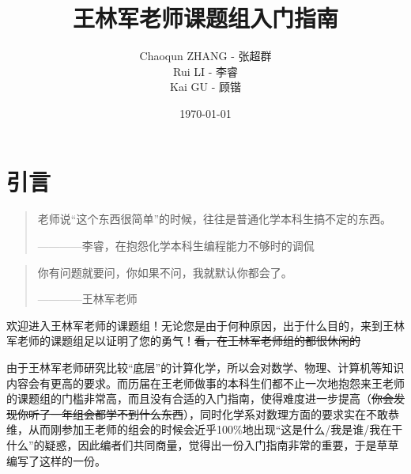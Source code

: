 \documentclass[12pt,a4paper,openany,twoside]{book}
\title{王林军老师课题组入门指南}
\author{Chaoqun ZHANG - 张超群\\Rui LI - 李睿\\Kai GU - 顾锴}
\date{\today}
\numberwithin{equation}{section}
\begin{document}
    \maketitle
    \tableofcontents
    \setcounter{page}{1}   %
    \makeatletter
    \let\ps@plain\ps@empty
    \makeatother
    \tableofcontents                                    %
    \mainmatter\medskip    %
    
    
    
    \newpage
    \chapter*{引言}
      \begin{quote}
        老师说“这个东西很简单”的时候，往往是普通化学本科生搞不定的东西。
        \begin{flushright}
          ————李睿，在抱怨化学本科生编程能力不够时的调侃
        \end{flushright}
      \end{quote}
      \begin{quote}
        你有问题就要问，你如果不问，我就默认你都会了。
        \begin{flushright}
          ————王林军老师
        \end{flushright}
      \end{quote}

      欢迎进入王林军老师的课题组！无论您是由于何种原因，出于什么目的，来到王林军老师的课题组足以证明了您的勇气！\sout{看，在王林军老师组的都很休闲的}

      由于王林军老师研究比较“底层”的计算化学，所以会对数学、物理、计算机等知识内容会有更高的要求。而历届在王老师做事的本科生们都不止一次地抱怨来王老师的课题组的门槛非常高，而且没有合适的入门指南，使得难度进一步提高（\sout{你会发现你听了一年组会都学不到什么东西}），同时化学系对数理方面的要求实在不敢恭维，从而刚参加王老师的组会的时候会近乎100\%地出现“这是什么/我是谁/我在干什么”的疑惑，因此编者们共同商量，觉得出一份入门指南非常的重要，于是草草编写了这样的一份。
\end{document}
